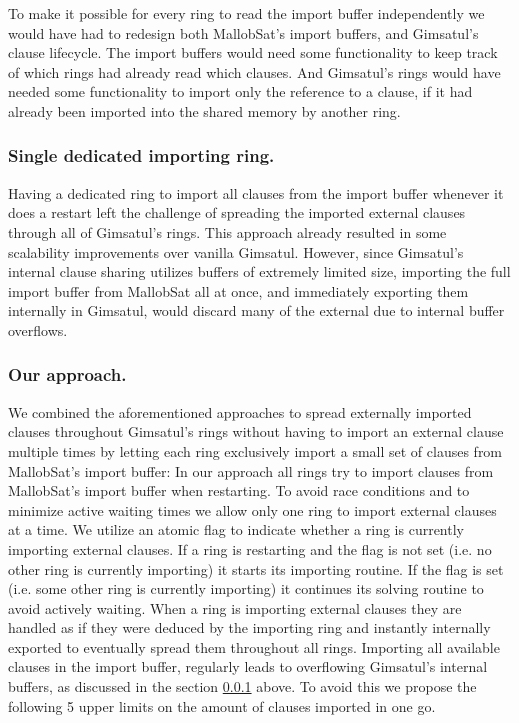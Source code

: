 \documentclass[12pt,a4paper,twoside]{scrartcl}
\numberwithin{equation}{section}
\begin{document}
To make it possible for every ring to read the import buffer independently we would have had to redesign both MallobSat's import buffers, and Gimsatul's clause lifecycle. The import buffers would need some functionality to keep track of which rings had already read which clauses. And Gimsatul's rings would have needed some functionality to import only the reference to a clause, if it had already been imported into the shared memory by another ring. 

\subsubsection{Single dedicated importing ring.}
\label{sec:singleDedicatedImportRing}

Having a dedicated ring to import all clauses from the import buffer whenever it does a restart left the challenge of spreading the imported external clauses through all of Gimsatul's rings. This approach already resulted in some scalability improvements over vanilla Gimsatul. However, since Gimsatul's internal clause sharing utilizes buffers of extremely limited size, importing the full import buffer from MallobSat all at once, and immediately exporting them internally in Gimsatul, would discard many of the external due to internal buffer overflows.

\subsubsection{Our approach.}

We combined the aforementioned approaches to spread externally imported clauses throughout Gimsatul's rings without having to import an external clause multiple times by letting each ring exclusively import a small set of clauses from MallobSat's import buffer: 
In our approach all rings try to import clauses from MallobSat's import buffer when restarting. To avoid race conditions and to minimize active waiting times we allow only one ring to import external clauses at a time. We utilize an atomic flag to indicate whether a ring is currently importing external clauses. If a ring is restarting and the flag is not set (i.e. no other ring is currently importing) it starts its importing routine. If the flag is set (i.e. some other ring is currently importing) it continues its solving routine to avoid actively waiting. 
When a ring is importing external clauses they are handled as if they were deduced by the importing ring and instantly internally exported to eventually spread them throughout all rings. Importing all available clauses in the import buffer, regularly leads to overflowing Gimsatul's internal buffers, as discussed in the section \ref{sec:singleDedicatedImportRing} above. To avoid this we propose the following 5 upper limits on the amount of clauses imported in one go.
\end{document}

